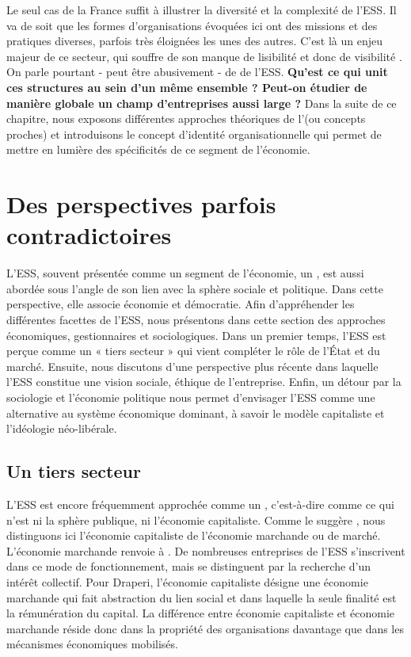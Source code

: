     Le seul cas de la France suffit à illustrer la diversité et la complexité de l'ESS. Il va de soit que les formes d'organisations évoquées ici ont des missions et des pratiques diverses, parfois très éloignées les unes des autres. C'est là un enjeu majeur de ce secteur, qui souffre de son manque de lisibilité et donc de visibilité \parencite{vercamer2010leconomie, davister2006gestion, monzon_campos2012social, huet2007pouvoir}. On parle pourtant - peut être abusivement - de  de l'ESS. \textbf{Qu'est ce qui unit ces structures au sein d'un même ensemble ? Peut-on étudier de manière globale un champ d'entreprises aussi large ?} Dans la suite de ce chapitre, nous exposons différentes approches théoriques de l'\ess (ou concepts proches) et introduisons le concept d'identité organisationnelle qui permet de mettre en lumière des spécificités de ce segment de l'économie.

    \section{Des perspectives parfois contradictoires }

        L'ESS, souvent présentée comme un segment de l'économie, un , est aussi abordée sous l'angle de son lien avec la sphère sociale et politique. Dans cette perspective, elle associe économie et démocratie. Afin d'appréhender les différentes facettes de l'ESS, nous présentons dans cette section des approches économiques, gestionnaires et sociologiques. Dans un premier temps, l'ESS est perçue comme un « tiers secteur » qui vient compléter le rôle de l'État et du marché. Ensuite, nous discutons d'une perspective plus récente dans laquelle l'ESS constitue une vision sociale, éthique de l'entreprise. Enfin, un détour par la sociologie et l'économie politique nous permet d'envisager l'ESS comme une alternative au système économique dominant, à savoir le modèle capitaliste et l'idéologie néo-libérale.

        \subsection{Un tiers secteur }
            L'ESS est encore fréquemment approchée comme un , c'est-à-dire comme ce qui n'est ni la sphère publique, ni l'économie capitaliste. Comme le suggère \textcite{draperi2015leconomie}, nous distinguons ici l'économie capitaliste de l'économie marchande ou de marché. L'économie marchande renvoie à  \parencite{laville2000leconomie}. De nombreuses entreprises de l'ESS s'inscrivent dans ce mode de fonctionnement, mais se distinguent par la recherche d'un intérêt collectif. Pour Draperi, l'économie capitaliste désigne une économie marchande qui fait abstraction du lien social et dans laquelle la seule finalité est la rémunération du capital. La différence entre économie capitaliste et économie marchande réside donc dans la propriété des organisations davantage que dans les mécanismes économiques mobilisés. \\

